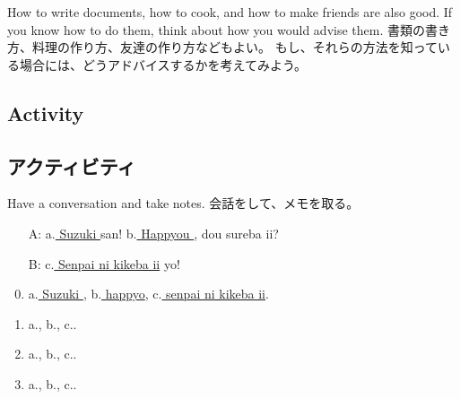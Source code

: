 \documentclass[uplatex,dvipdfmx,b5paper,english,10pt]{jsbook}
\begin{document}
\begin{toianswer}
\ifEnglish
How to write documents, how to cook, and how to make friends are also good.
If you know how to do them, think about how you would advise them.
\else
書類の書き方、料理の作り方、友達の作り方などもよい。
もし、それらの方法を知っている場合には、どうアドバイスするかを考えてみよう。
\fi
\end{toianswer}

\ifEnglish
\subsection{Activity}
\else
\subsection{アクティビティ}
\fi
\begin{toiquestion}
\ifEnglish
Have a conversation and take notes.
\else
会話をして、メモを取る。
\fi
\end{toiquestion}

\begin{itemize}
 \item[A:] a.\underline{ Suzuki } san! b.\underline{ Happyou }, dou sureba ii?
 \item[B:] c.\underline{ Senpai ni kikeba ii} yo!
\end{itemize}

\begin{enumerate}
 \setcounter{enumi}{-1}
 \item a.\underline{ Suzuki \hspace{6.1zw}}, b.\underline{ happyo\hspace{6.2zw}}, c.\underline{ senpai ni kikeba ii\hspace{4zw}}.
 \item a.\underline{\hspace{10zw}}, b.\underline{\hspace{10zw}}, c.\underline{\hspace{13zw}}.
 \item a.\underline{\hspace{10zw}}, b.\underline{\hspace{10zw}}, c.\underline{\hspace{13zw}}.
 \item a.\underline{\hspace{10zw}}, b.\underline{\hspace{10zw}}, c.\underline{\hspace{13zw}}.
\end{enumerate}
\end{document}
